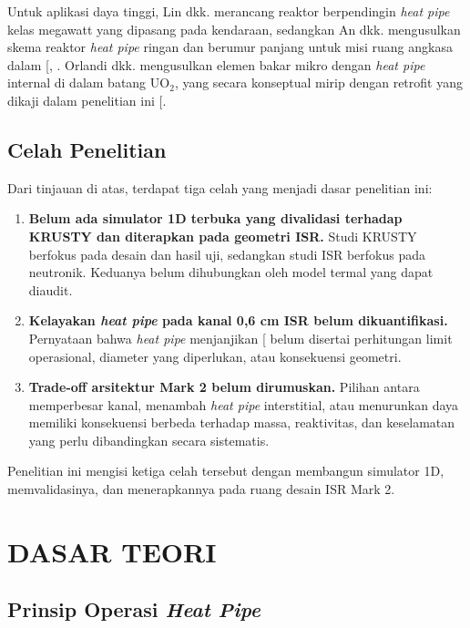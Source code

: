 \documentclass[
  indonesian,
  12pt,
  a4paper,
]{report}
\providecommand{\tightlist}{%
  \setlength{\itemsep}{0pt}\setlength{\parskip}{0pt}}
\begin{document}
Untuk aplikasi daya tinggi, Lin dkk. merancang reaktor berpendingin
\emph{heat pipe} kelas megawatt yang dipasang pada kendaraan, sedangkan
An dkk. mengusulkan skema reaktor \emph{heat pipe} ringan dan berumur
panjang untuk misi ruang angkasa dalam {[},
\citeproc{ref-an2024}{26}{]}. Orlandi dkk. mengusulkan elemen bakar
mikro dengan \emph{heat pipe} internal di dalam batang UO\(_2\), yang
secara konseptual mirip dengan retrofit yang dikaji dalam penelitian ini
{[}\citeproc{ref-orlandi2024}{27}{]}.

\section{Celah Penelitian}\label{celah-penelitian}

Dari tinjauan di atas, terdapat tiga celah yang menjadi dasar penelitian
ini:

\begin{enumerate}
\def\labelenumi{\arabic{enumi}.}
\tightlist
\item
  \textbf{Belum ada simulator 1D terbuka yang divalidasi terhadap KRUSTY
  dan diterapkan pada geometri ISR.} Studi KRUSTY berfokus pada desain
  dan hasil uji, sedangkan studi ISR berfokus pada neutronik. Keduanya
  belum dihubungkan oleh model termal yang dapat diaudit.
\item
  \textbf{Kelayakan \emph{heat pipe} pada kanal 0,6 cm ISR belum
  dikuantifikasi.} Pernyataan bahwa \emph{heat pipe} menjanjikan
  {[}\citeproc{ref-khandaq2020}{7}{]} belum disertai perhitungan limit
  operasional, diameter yang diperlukan, atau konsekuensi geometri.
\item
  \textbf{Trade-off arsitektur Mark 2 belum dirumuskan.} Pilihan antara
  memperbesar kanal, menambah \emph{heat pipe} interstitial, atau
  menurunkan daya memiliki konsekuensi berbeda terhadap massa,
  reaktivitas, dan keselamatan yang perlu dibandingkan secara
  sistematis.
\end{enumerate}

Penelitian ini mengisi ketiga celah tersebut dengan membangun simulator
1D, memvalidasinya, dan menerapkannya pada ruang desain ISR Mark 2.

\chapter{DASAR TEORI}\label{sec-theory}

\section{\texorpdfstring{Prinsip Operasi \emph{Heat
Pipe}}{Prinsip Operasi Heat Pipe}}\label{prinsip-operasi-heat-pipe}
\end{document}
